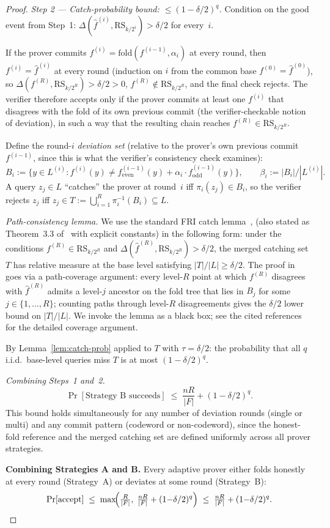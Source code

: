 \documentclass[11pt]{article}
\newcommand{\RS}{\mathrm{RS}}
\begin{document}
\begin{proof}
\emph{Step 2 --- Catch-probability bound: $\leq (1-\delta/2)^q$.}
Condition on the good event from Step~1: $\Delta(\hat f^{(i)}, \RS_{k/2^i}) > \delta/2$ for every~$i$.

If the prover commits $f^{(i)} = \mathrm{fold}(f^{(i-1)}, \alpha_i)$ at every round, then $f^{(i)} = \hat f^{(i)}$ at every round (induction on $i$ from the common base $f^{(0)} = \hat f^{(0)}$), so $\Delta(f^{(R)}, \RS_{k/2^R}) > \delta/2 > 0$, $f^{(R)} \notin \RS_{k/2^R}$, and the final check rejects.  The verifier therefore accepts only if the prover commits at least one $f^{(i)}$ that disagrees with the fold of its own previous commit (the verifier-checkable notion of deviation), in such a way that the resulting chain reaches $f^{(R)} \in \RS_{k/2^R}$.

Define the round-$i$ \emph{deviation set} (relative to the prover's own previous commit $f^{(i-1)}$, since this is what the verifier's consistency check examines):
\[
B_i := \{y \in L^{(i)} : f^{(i)}(y) \neq f^{(i-1)}_{\mathrm{even}}(y) + \alpha_i \cdot f^{(i-1)}_{\mathrm{odd}}(y)\}, \qquad \beta_i := |B_i|/|L^{(i)}|.
\]
A query $z_j \in L$ ``catches'' the prover at round~$i$ iff $\pi_i(z_j) \in B_i$, so the verifier rejects $z_j$ iff $z_j \in T := \bigcup_{i=1}^R \pi_i^{-1}(B_i) \subseteq L$.

\emph{Path-consistency lemma.}  We use the standard FRI catch lemma~\cite[Lemma~4.1, \S6]{BBHR}, \cite[Lemma~8.2]{BCIKS} (also stated as Theorem~3.3 of~\cite{BCIKS} with explicit constants) in the following form: under the conditions $f^{(R)} \in \RS_{k/2^R}$ and $\Delta(\hat f^{(R)}, \RS_{k/2^R}) > \delta/2$, the merged catching set $T$ has relative measure at the base level satisfying $|T|/|L| \geq \delta/2$.  The proof in~\cite{BBHR,BCIKS} goes via a path-coverage argument: every level-$R$ point at which $f^{(R)}$ disagrees with $\hat f^{(R)}$ admits a level-$j$ ancestor on the fold tree that lies in $B_j$ for some $j \in \{1, \ldots, R\}$; counting paths through level-$R$ disagreements gives the $\delta/2$ lower bound on $|T|/|L|$.  We invoke the lemma as a black box; see the cited references for the detailed coverage argument.

By Lemma~\ref{lem:catch-prob} applied to $T$ with $\tau = \delta/2$: the probability that all $q$ i.i.d.\ base-level queries miss $T$ is at most $(1-\delta/2)^q$.

\emph{Combining Steps~1 and~2.}
\[
\Pr[\text{Strategy B succeeds}] \;\leq\; \frac{nR}{|F|} + (1 - \delta/2)^q.
\]
This bound holds simultaneously for any number of deviation rounds (single or multi) and any commit pattern (codeword or non-codeword), since the honest-fold reference and the merged catching set are defined uniformly across all prover strategies.

\textbf{Combining Strategies A and B.}
Every adaptive prover either folds honestly at every round (Strategy~A) or deviates at some round (Strategy~B):
\[
\Pr[\text{accept}] \;\leq\; \max\!\Bigl(\tfrac{R}{|F|},\; \tfrac{nR}{|F|} + (1{-}\delta/2)^q\Bigr) \;\leq\; \tfrac{nR}{|F|} + (1{-}\delta/2)^q. \qedhere
\]
\end{proof}
\end{document}
